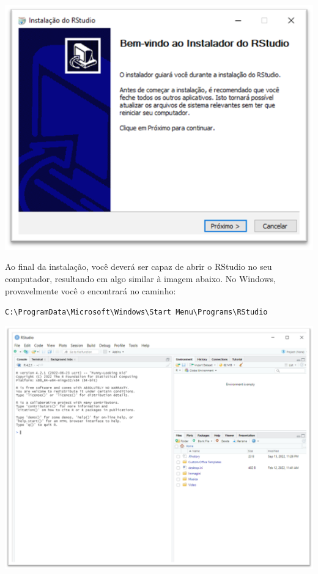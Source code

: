 \documentclass[
  letterpaper,
  DIV=11,
  numbers=noendperiod]{scrreprt}
\begin{document}
\begin{enumerate}
  \begin{center}
  \includegraphics{images/clipboard-987499479.png}
  \end{center}
\end{enumerate}

Ao final da instalação, você deverá ser capaz de abrir o RStudio no seu
computador, resultando em algo similar à imagem abaixo. No Windows,
provavelmente você o encontrará no caminho:

\texttt{C:\textbackslash{}ProgramData\textbackslash{}Microsoft\textbackslash{}Windows\textbackslash{}Start\ Menu\textbackslash{}Programs\textbackslash{}RStudio}

\begin{center}
\includegraphics{images/clipboard-1128946571.png}
\end{center}
\end{document}

